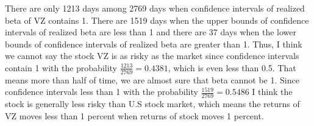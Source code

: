 \documentclass{report}
\begin{document}
There are only 1213 days among 2769 days when confidence intervals of realized beta of VZ contains 1. There are 1519 days when the upper bounds of confidence intervals of realized beta are less than 1 and there are 37 days when the lower bounds of confidence intervals of realized beta are greater than 1. Thus, I think we cannot say the stock VZ is as risky as the market since confidence intervals contain 1 with the probability $ \frac{1213}{2769} = 0.4381 $, which is even less than 0.5. That means more than half of time, we are almost sure that beta cannot be 1. Since confidence intervals less than 1 with the probability $ \frac{1519}{2769} = 0.5486 $ I think the stock is generally less risky than U.S stock market, which means the returns of VZ moves less than 1 percent when returns of stock moves 1 percent.
\end{document}
